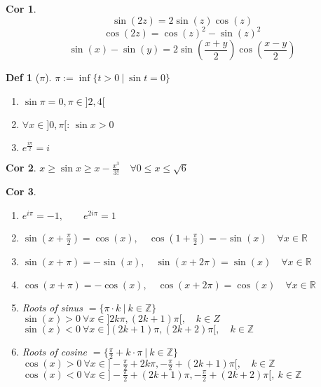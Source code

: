 \documentclass[a4paper, 10pt]{article}
\newtheorem*{corollary}{Cor}
\theoremstyle{definition}
\newtheorem*{definition}{Def}
\theoremstyle{ex}
\theoremstyle{named}
\newcommand{\R}{\mathbb{R}}
\newcommand{\Z}{\mathbb{Z}}
\begin{document}
\begin{corollary}
    $$\sin(2z) = 2 \sin(z)\cos(z)$$
    $$\cos(2z) = \cos(z)^2 - \sin(z)^2$$
    $$\sin(x) - \sin(y) = 2 \sin\left(\frac{x + y}{2}\right)\cos\left(\frac{x - y}{2}\right)$$
\end{corollary}

\begin{definition}[$\pi$]
    $\pi := \inf \{ t > 0 \ | \ \sin t = 0\}$
    \begin{enumerate}[label=(\roman*)]
        \item $\sin \pi = 0, \pi \in ]2, 4[$
        \item $\forall x \in ]0, \pi[$: $\sin x > 0$
        \item $e^{\frac{i \pi}{2}} = i$
    \end{enumerate}
\end{definition}

\begin{corollary}
    $x \geq \sin x \geq x - \frac{x^3}{3!} \quad \forall 0 \leq x \leq \sqrt{6}$
\end{corollary}

\begin{corollary}
    \begin{enumerate}
        \item $e^{i\pi}=-1, \qquad e^{2i\pi}=1$
        \item $\sin(x+\frac{\pi}{2}) = \cos(x), \quad \cos(1+\frac{\pi}{2}) = -\sin(x) \quad \forall x \in \R$
        \item $\sin(x+\pi)=-\sin(x), \quad \sin(x+2\pi) = \sin(x) \quad \forall x \in \R$
        \item $\cos(x+\pi) = -\cos(x), \quad \cos(x+2\pi) = \cos(x) \quad \forall x \in \R$
        \item Roots of sinus $= \{\pi \cdot k \ | \ k \in \Z \}$ \\ 
        $\sin(x) > 0 \ \forall x \in ] 2k \pi, (2k + 1)\pi [, \quad k \in Z$ \\
        $\sin(x) < 0 \ \forall x \in ] (2k + 1)\pi, (2k + 2) \pi [, \quad k \in \Z$
        \item Roots of cosine $= \{\frac{\pi}{2} + k \cdot \pi \ | \ k \in \Z \}$ \\
        $\cos(x) > 0 \ \forall x \in ] - \frac{\pi}{2} + 2k \pi, - \frac{\pi}{2} + (2k + 1)\pi [, \quad k \in \Z$ \\
        $\cos(x) < 0 \ \forall x \in ] -\frac{\pi}{2} + (2k + 1) \pi, - \frac{\pi}{2} + (2k + 2) \pi [, \ k \in \Z$
    \end{enumerate}
\end{corollary}
\end{document}
